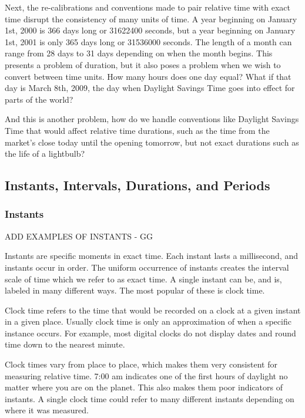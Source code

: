 \documentclass[article]{jss}
\begin{document}
Next, the re-calibrations and conventions made to pair relative time with exact time disrupt the consistency of many units of time.  A year beginning on January 1st, 2000 is 366 days long or 31622400 seconds, but a year beginning on January 1st, 2001 is only 365 days long or 31536000 seconds.  The length of a month can range from 28 days to 31 days depending on when the month begins. This presents a problem of duration, but it also poses a problem when we wish to convert between time units. How many hours does one day equal? What if that day is March 8th, 2009, the day when Daylight Savings Time goes into effect for parts of the world?

And this is another problem, how do we handle conventions like Daylight Savings Time that would affect relative time durations, such as the time from the market's close today until the opening tomorrow, but not exact durations such as the life of a lightbulb?

\subsection{Instants, Intervals, Durations, and Periods}
\label{sec:types}

\subsubsection{Instants}

ADD EXAMPLES OF INSTANTS - GG

Instants are specific moments in exact time. Each instant lasts a millisecond, and instants occur in order. The uniform occurrence of instants creates the interval scale of time which we refer to as exact time. A single instant can be, and is, labeled in many different ways.  The most popular of these is clock time.

Clock time refers to the time that would be recorded on a clock at a given instant in a given place. Usually clock time is only an approximation of when a specific instance occurs. For example, most digital clocks do not display dates and round time down to the nearest minute.

Clock times vary from place to place, which makes them very consistent for measuring relative time.  7:00 am indicates one of the first hours of daylight no matter where you are on the planet. This also makes them poor indicators of instants. A single clock time could refer to many different instants depending on where it was measured.
\end{document}

